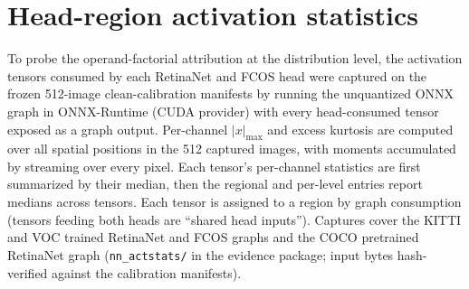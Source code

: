 \documentclass[10pt]{article}
\begin{document}
\begin{table}[htbp]
\centering\scriptsize
\caption{Fivefold rebuild audit per arm: every rebuild is bit-distinct at
both engine and inspector level. Layers: minimum--maximum fused-layer count.
AP spread: maximum minus minimum AP across rebuilds, for original-clean and
codec-control inputs; dashes mark unevaluated arms.}
\label{tab:nn-rebuild}
{\setlength{\tabcolsep}{3pt}}
\end{table}

\section{Head-region activation statistics}
\label{sec:actstats}

To probe the operand-factorial attribution at the distribution level, the activation tensors consumed by each RetinaNet and FCOS head were captured on
the frozen 512-image clean-calibration manifests by running the unquantized ONNX
graph in ONNX-Runtime (CUDA provider) with every head-consumed tensor
exposed as a graph output. Per-channel $|x|_{\max}$ and excess kurtosis are
computed over all spatial positions in the 512 captured images, with moments
accumulated by streaming over every pixel. Each tensor's per-channel
statistics are first summarized by their median, then the regional and
per-level entries report medians across tensors. Each tensor is assigned to
a region by graph consumption (tensors
feeding both heads are ``shared head inputs''). Captures cover the KITTI
and VOC trained RetinaNet and FCOS graphs and the COCO pretrained RetinaNet graph
(\texttt{nn\_actstats/} in the evidence package; input bytes hash-verified
against the calibration manifests).
\end{document}
